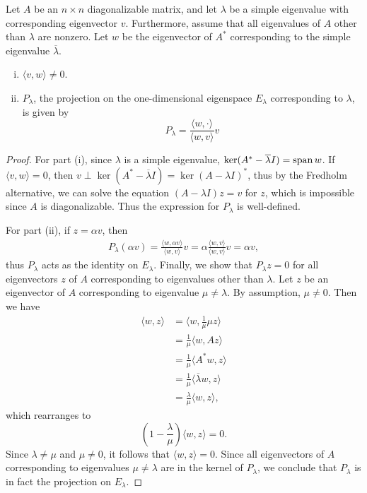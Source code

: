 \documentclass[thesis.tex]{subfiles}
\begin{document}
\begin{lemma}\label{eigprojlemma}
Let $A$ be an $n \times n$ diagonalizable matrix, and let $\lambda$ be a simple eigenvalue with corresponding eigenvector $v$. Furthermore, assume that all eigenvalues of $A$ other than $\lambda$ are nonzero. Let $w$ be the eigenvector of $A^*$ corresponding to the simple eigenvalue $\overline{\lambda}$.
\begin{enumerate}[(i)]
\item $\langle v, w \rangle \neq 0$.
\item $P_\lambda$, the projection on the one-dimensional eigenspace $E_\lambda$ corresponding to $\lambda$, is given by
\begin{equation}\label{Plambda}
P_{\lambda} = \frac{ \langle w, \cdot \rangle }{\langle w, v \rangle } v
\end{equation}
\end{enumerate}
\begin{proof}
For part (i), since $\lambda$ is a simple eigenvalue, $\mathop\mathrm{ker}\nolimits(A^* - \overline{\lambda}I) = \operatorname{span}{w}$. If $\langle v, w \rangle = 0$, then $v \perp \ker(A^* - \overline{\lambda}I) = \ker (A - \lambda I)^*$, thus by the Fredholm alternative, we can solve the equation $(A - \lambda I)z = v$ for $z$, which is impossible since $A$ is diagonalizable. Thus the expression for $P_\lambda$ is well-defined.

For part (ii), if $z = \alpha v$, then
\begin{align*}
P_{\lambda}(\alpha v) = \frac{ \langle w, \alpha v \rangle }{\langle w, v \rangle } v = 
 \alpha  \frac{ \langle w, v \rangle }{\langle w, v \rangle } v = \alpha v,
\end{align*}
thus $P_\lambda$ acts as the identity on $E_\lambda$. Finally, we show that $P_\lambda z = 0$ for all eigenvectors $z$ of $A$ corresponding to eigenvalues other than $\lambda$. Let $z$ be an eigenvector of $A$ corresponding to eigenvalue $\mu \neq \lambda$. By assumption, $\mu \neq 0$. Then we have
\begin{align*}
\langle w, z \rangle &= \langle w, \frac{1}{\mu} \mu z\rangle \\
&= \frac{1}{\mu}\langle w, A z \rangle \\
&= \frac{1}{\mu}\langle A^* w, z \rangle \\
&= \frac{1}{\mu}\langle \overline{\lambda} w, z \rangle \\
&= \frac{\lambda}{\mu}\langle w, z \rangle,
\end{align*}
which rearranges to 
\[
\left( 1 - \frac{\lambda}{\mu} \right) \langle w, z \rangle = 0.
\]
Since $\lambda \neq \mu$ and $\mu \neq 0$, it follows that $\langle w, z \rangle = 0$. Since all eigenvectors of $A$ corresponding to eigenvalues $\mu \neq \lambda$ are in the kernel of $P_\lambda$, we conclude that $P_\lambda$ is in fact the projection on $E_\lambda$.

\end{proof}
\end{lemma}
\end{document}
